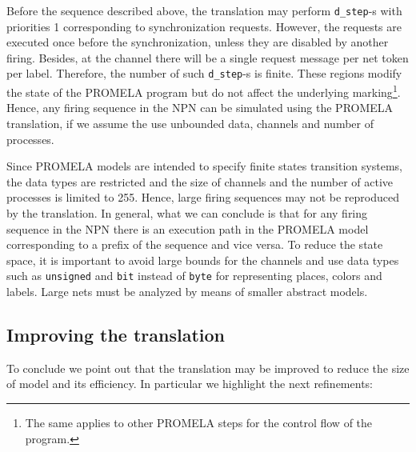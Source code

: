\documentclass{llncs}
\begin{document}
Before the sequence described above, the translation may perform \small\verb"d_step"\nfont-s with priorities 1 corresponding to synchronization requests. However, the requests are executed once before the synchronization, unless they are disabled by another firing. Besides, at the channel there will be a single request message per net token per label. Therefore, the number of such  \small\verb"d_step"\nfont-s is finite. These regions modify the state of the PROMELA program but do not affect the underlying marking\footnote{The same applies to other PROMELA steps for the control flow of the program.}. Hence, any firing sequence in the NPN can be simulated using the PROMELA translation, if we assume the use unbounded data, channels and number of processes.

Since PROMELA models are intended to specify finite states transition systems, the data types are restricted and the size of channels and the number of active processes is limited to 255. Hence, large firing sequences may not be reproduced by the translation. In general, what we can conclude is that for any firing sequence in the NPN there is an execution path in the PROMELA model corresponding to a prefix of the sequence and vice versa. To reduce the state space, it is important to avoid large bounds for the channels and use data types such as \texttt{unsigned} and \texttt{bit} instead of \texttt{byte} for representing places, colors and labels. Large nets must be analyzed by means of smaller abstract models.


\subsection{Improving the translation}


To conclude we point out that the translation may be improved to reduce the size of model and its efficiency. In particular we highlight the next refinements:
\end{document}
